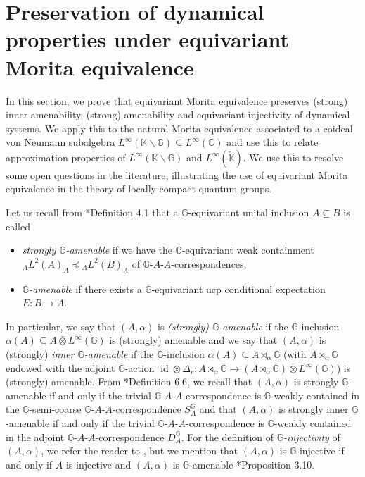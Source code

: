 \documentclass[reqno]{amsart}
\numberwithin{equation}{section}
\DeclareMathOperator{\id}{\mathrm{id}}
\newcommand{\G}{\mathbb{G}}
\newcommand{\ovot}{\bar{\otimes}}
\begin{document}
\section{Preservation of dynamical properties under equivariant Morita equivalence}

In this section, we prove that equivariant Morita equivalence preserves (strong) inner amenability, (strong) amenability and equivariant injectivity of dynamical systems. We apply this to the natural Morita equivalence associated to a coideal von Neumann subalgebra $L^\infty(\mathbb{K}\backslash \G)\subseteq L^\infty(\G)$ and use this to relate approximation properties of $L^\infty(\mathbb{K}\backslash \G)$ and $L^\infty(\check{\mathbb{K}})$. We use this to resolve some open questions in the literature, illustrating the use of equivariant Morita equivalence in the theory of locally compact quantum groups.

Let us recall from \cite{DCDR24a}*{Definition 4.1} that a $\G$-equivariant unital inclusion $A \subseteq B$ is called \begin{itemize}\setlength\itemsep{-0.5em}
    \item \emph{strongly $\G$-amenable}  if we have the $\G$-equivariant weak containment ${}_A L^2(A)_A\preccurlyeq {}_A L^2(B)_A$ of $\G$-$A$-$A$-correspondences,
    \item \emph{$\G$-amenable} if there exists a $\G$-equivariant ucp conditional expectation $E: B \to A$.
\end{itemize}
In particular, we say that $(A, \alpha)$ is \emph{(strongly) $\G$-amenable} if the $\G$-inclusion $\alpha(A)\subseteq A\ovot L^\infty(\G)$ is (strongly) amenable and we say that $(A, \alpha)$ is (strongly) \emph{inner $\G$-amenable} if the $\G$-inclusion $\alpha(A)\subseteq A\rtimes_\alpha \G$ (with $A\rtimes_\alpha \G$ endowed with the adjoint $\G$-action $\id \otimes \Delta_r: A\rtimes_\alpha \G \to (A\rtimes_\alpha \G)\ovot L^\infty(\G)$) is (strongly) amenable.   From \cite{DCDR24a}*{Definition 6.6}, we recall that $(A, \alpha)$ is strongly $\G$-amenable if and only if the trivial $\G$-$A$-$A$ correspondence is $\G$-weakly contained in the $\G$-semi-coarse $\G$-$A$-$A$-correspondence $S_A^\G$  and that $(A, \alpha)$ is strongly inner $\G$-amenable if and only if the trivial $\G$-$A$-$A$-correspondence is $\G$-weakly contained in the adjoint $\G$-$A$-$A$-correspondence $D_A^\G$. For the definition of \emph{$\G$-injectivity} of $(A, \alpha)$, we refer the reader to \cite{DR24a}, but we mention that $(A, \alpha)$ is $\G$-injective if and only if $A$ is injective and $(A,\alpha)$ is $\G$-amenable \cite{DR24a}*{Proposition 3.10}.
\end{document}
